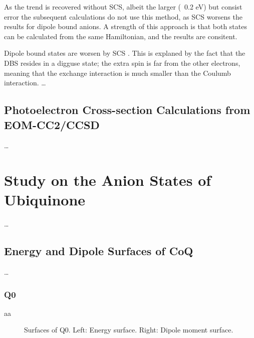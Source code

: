 As the trend is recovered without SCS, albeit the larger (~0.2 eV) but consist error the subsequent calculations do not use this method, as SCS worsens the results for dipole bound anions. A strength of this approach is that both states can be calculated from the same Hamiltonian, and the results are consitent.

Dipole bound states are worsen by SCS \cite{paran2024performance}. This is explaned by the fact that the DBS resides in a digguse state; the extra spin is far from the other electrons, meaning that the exchange interaction is much smaller than the Coulumb interaction.
\ldots
\subsection{Photoelectron Cross-section Calculations from EOM-CC2/CCSD}

\ldots
\section{Study on the Anion States of Ubiquinone}

\ldots
\subsection{Energy and Dipole Surfaces of CoQ}

\ldots
\subsubsection{Q0}
aa

\begin{figure}[ht!]
  \centering
  \begin{minipage}[]{0.49\textwidth}
    \centering
    \small
    
  \end{minipage}%
  \begin{minipage}[]{0.47\textwidth}
    \centering
    \small
    
  \end{minipage}
  \begin{minipage}[]{0.49\textwidth}
    \centering
    \small
    
  \end{minipage}%
  \begin{minipage}[]{0.47\textwidth}
    \centering
    \small
    
  \end{minipage}
  \label{fig:Q0_surf}
  \caption[Surfaces of Q0]{Surfaces of Q0. Left: Energy surface. Right: Dipole moment surface.}
\end{figure}

